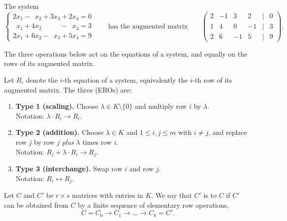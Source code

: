 \begin{example}
The system
\[
\begin{cases}
2x_1 - \phantom{1}x_2 + 3x_3 + 2x_4 = 0 \\
\phantom{2}x_1 + 4x_2 \phantom{{}+ 3x_3} - \phantom{2}x_4 = 3 \\
2x_1 + 6x_2 - \phantom{3}x_3 + 5x_4 = 9
\end{cases}
\qquad \text{has the augmented matrix} \qquad
\begin{pmatrix}
2 & -1 & 3 & 2 & \big| & 0 \\
1 & 4 & 0 & -1 & \big| & 3 \\
2 & 6 & -1 & 5 & \big| & 9
\end{pmatrix}.
\]
\end{example}

The three operations below act on the equations of a system, and equally on the rows of its augmented matrix.

\begin{definition}
\label{def:elementary_row_operations}
Let $R_i$ denote the $i$-th equation of a system, equivalently the $i$-th row of its augmented matrix. The three  (EROs) are:
\begin{enumerate}[label=\textbf{(\alph*)}]
    \item \textbf{Type 1 (scaling).} Choose $\lambda \in K \setminus \{0\}$ and multiply row $i$ by $\lambda$. \\
    Notation: $\lambda \cdot R_i \to R_i$.
    \item \textbf{Type 2 (addition).} Choose $\lambda \in K$ and $1 \le i, j \le m$ with $i \ne j$, and replace row $j$ by row $j$ \emph{plus} $\lambda$ times row $i$. \\
    Notation: $R_j + \lambda \cdot R_i \to R_j$.
    \item \textbf{Type 3 (interchange).} Swap row $i$ and row $j$. \\
    Notation: $R_i \leftrightarrow R_j$.
\end{enumerate}
\end{definition}

\begin{definition}
\label{def:row_equivalence}
Let $C$ and $C'$ be $r \times s$ matrices with entries in $K$. We say that $C'$ is  to $C$ if $C'$ can be obtained from $C$ by a finite sequence of elementary row operations,
\[
C = C_0 \longrightarrow C_1 \longrightarrow \dots \longrightarrow C_k = C'.
\]
\end{definition}

